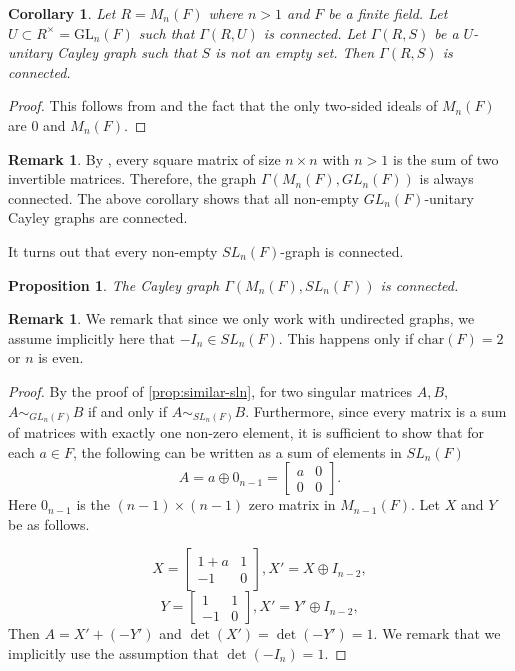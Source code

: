 \documentclass[12pt, a4paper]{amsart}
\newtheorem{prop}[thm]{Proposition}
\newtheorem{cor}[thm]{Corollary}
\theoremstyle{definition}
\newtheorem{rem}[thm]{Remark}
\numberwithin{equation}{section}
\begin{document}
\begin{cor} \label{cor:matrix-connected}
    Let $R=M_n(F)$ where $n>1$ and $F$ be a finite field. Let $U \subset R^{\times} = \text{GL}_n(F)$ such that $\Gamma(R, U)$ is connected. Let $\Gamma(R,S)$ be a $U$-unitary Cayley graph such that $S$ is not an empty set. Then $\Gamma(R,S)$ is connected. 
\end{cor}

\begin{proof}
This follows from  and the fact that the only two-sided ideals of $M_n(F)$ are $0$ and $M_n(F).$
\end{proof}

\begin{rem} \label{rem:sum-invertible}
    By \cite{invertible_matrices}, every square matrix of size $n \times n$ with $n>1$ is the sum of two invertible matrices. Therefore, the graph $\Gamma(M_n(F), GL_n(F))$ is always connected.  The above corollary shows that all non-empty $GL_n(F)$-unitary Cayley graphs are connected. 
\end{rem}

It turns out that every non-empty $SL_n(F)$-graph is connected. 
\begin{prop}
    The Cayley graph $\Gamma(M_n(F), SL_n(F))$ is connected. 
\end{prop}

\begin{rem}
    We remark that since we only work with undirected graphs, we assume implicitly here that $-I_n \in SL_n(F).$ This happens only if $\text{char}(F)=2$ or $n$ is even. 
\end{rem}
\begin{proof}
    By the proof of \cref{prop:similar-sln}, for two singular matrices $A,B$, $A \sim_{GL_n(F)} B$ if and only if $A \sim_{SL_n(F)} B.$ Furthermore, since every matrix is a sum of matrices with exactly one non-zero element, it is sufficient to show that for each $a \in F$, the following can be written as a sum of elements in $SL_n(F)$ 
\[A = a \oplus 0_{n-1} = \begin{bmatrix} a & 0 \\ 0 & 0 \end{bmatrix}. \]
Here $0_{n-1}$ is the $(n-1) \times (n-1)$ zero matrix in $M_{n-1}(F).$ Let $X$ and $Y$ be as follows. 

\[ X = \begin{bmatrix} 1+a & 1 \\ -1 & 0 \end{bmatrix}, X' = X \oplus I_{n-2}, \]
\[ Y = \begin{bmatrix} 1 & 1 \\ -1 & 0 \end{bmatrix}, X' = Y' \oplus I_{n-2}, \]
Then $A=X'+ (-Y')$ and $\det(X')=\det(-Y')=1.$ We remark that we implicitly use the assumption that $\det(-I_n)=1.$
\end{proof}
\end{document}
